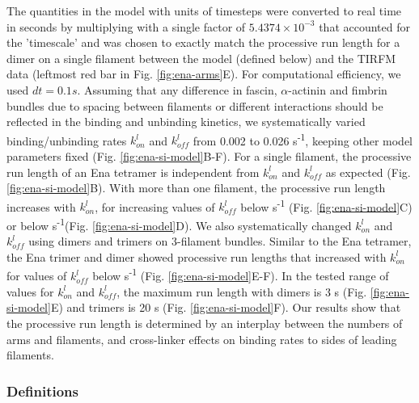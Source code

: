 The quantities in the model with units of timesteps were converted to real time in seconds by multiplying with a single factor of $5.4374 \times 10^{-3}$ that accounted for the 'timescale' and was chosen to exactly match the processive run length for a dimer on a single filament between the model (defined below) and the TIRFM data (leftmost red bar in Fig. \ref{fig:ena-arms}E). For computational efficiency, we used $dt=0.1 s$.
	Assuming that any difference in fascin, $\alpha$-actinin and fimbrin bundles due to spacing between filaments or different interactions should be reflected in the binding and unbinding kinetics, we systematically varied binding/unbinding rates $k_{on}^{l}$ and $k_{off}^{l}$ from 0.002 to 0.026 s\textsuperscript{-1}, keeping other model parameters fixed (Fig. \ref{fig:ena-si-model}B-F). For a single filament, the processive run length of an Ena tetramer is independent from $k_{on}^{l}$ and $k_{off}^{l}$ as expected (Fig. \ref{fig:ena-si-model}B). With more than one filament, the processive run length increases with $k_{on}^{l}$, for increasing values of $k_{off}^{l}$ below  s\textsuperscript{-1} (Fig. \ref{fig:ena-si-model}C) or below  s\textsuperscript{-1}(Fig. \ref{fig:ena-si-model}D). We also systematically changed $k_{on}^{l}$ and $k_{off}^{l}$ using dimers and trimers on 3-filament bundles. Similar to the Ena tetramer, the Ena trimer and dimer showed processive run lengths that increased with $k_{on}^{l}$ for values of $k_{off}^{l}$ below  s\textsuperscript{-1} (Fig. \ref{fig:ena-si-model}E-F). In the tested range of values for $k_{on}^{l}$ and $k_{off}^{l}$, the maximum run length with dimers is 3 s (Fig. \ref{fig:ena-si-model}E) and trimers is 20 s (Fig. \ref{fig:ena-si-model}F). Our results show that the processive run length is determined by an interplay between the numbers of arms and filaments, and cross-linker effects on binding rates to sides of leading filaments.
    
\subsubsection{Definitions}\label{ena-si-definitions}

